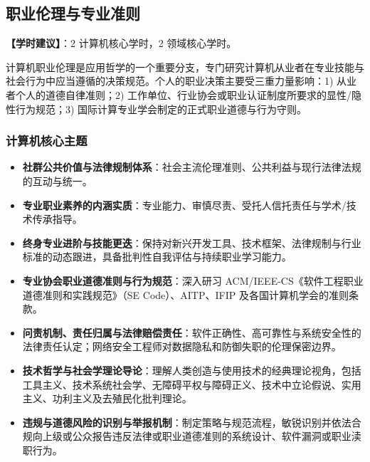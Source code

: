 \subsection{职业伦理与专业准则}
\textbf{【学时建议】}：2 计算机核心学时，2 领域核心学时。

计算机职业伦理是应用哲学的一个重要分支，专门研究计算机从业者在专业技能与社会行为中应当遵循的决策规范。个人的职业决策主要受三重力量影响：1) 从业者个人的道德自律准则；2) 工作单位、行业协会或职业认证制度所要求的显性/隐性行为规范；3) 国际计算专业学会制定的正式职业道德与行为守则。

\subsubsection{计算机核心主题}
\begin{itemize}
    \item \textbf{社群公共价值与法律规制体系}：社会主流伦理准则、公共利益与现行法律法规的互动与统一。
    \item \textbf{专业职业素养的内涵实质}：专业能力、审慎尽责、受托人信托责任与学术/技术传承指导。
    \item \textbf{终身专业进阶与技能更迭}：保持对新兴开发工具、技术框架、法律规制与行业标准的动态跟进，具备批判性自我评估与持续职业学习能力。
    \item \textbf{专业协会职业道德准则与行为规范}：深入研习 ACM/IEEE-CS《软件工程职业道德准则和实践规范》（SE Code）、AITP、IFIP 及各国计算机学会的准则条款。
    \item \textbf{问责机制、责任归属与法律赔偿责任}：软件正确性、高可靠性与系统安全性的法律责任认定；网络安全工程师对数据隐私和防御失职的伦理保密边界。
    \item \textbf{技术哲学与社会学理论导论}：理解人类创造与使用技术的经典理论视角，包括工具主义、技术系统社会学、无障碍平权与障碍正义、技术中立论假说、实用主义、功利主义及去殖民化批判理论。
    \item \textbf{违规与道德风险的识别与举报机制}：制定策略与规范流程，敏锐识别并依法合规向上级或公众报告违反法律或职业道德准则的系统设计、软件漏洞或职业渎职行为。
\end{itemize}

